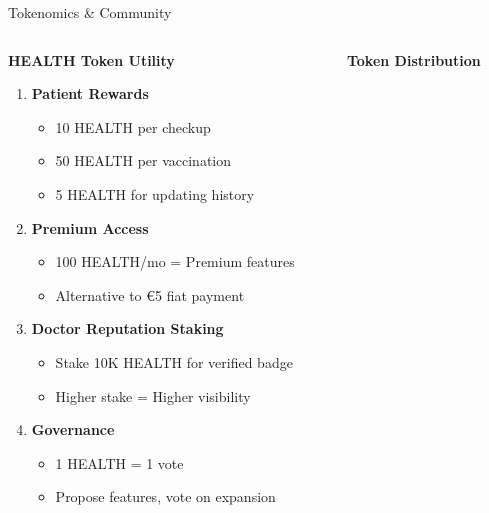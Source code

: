 \documentclass[aspectratio=169,xcolor=dvipsnames,20pt]{beamer}
\begin{document}
\begin{frame}{Tokenomics \& Community}

  \begin{columns}[T]
    \begin{column}{0.5\textwidth}
      \textbf{\textcolor{HederaPurple}{HEALTH Token Utility}}

      \begin{enumerate}
        \item \textbf{Patient Rewards}
        \begin{itemize}
          \item 10 HEALTH per checkup
          \item 50 HEALTH per vaccination
          \item 5 HEALTH for updating history
        \end{itemize}

        \item \textbf{Premium Access}
        \begin{itemize}
          \item 100 HEALTH/mo = Premium features
          \item Alternative to €5 fiat payment
        \end{itemize}

        \item \textbf{Doctor Reputation Staking}
        \begin{itemize}
          \item Stake 10K HEALTH for verified badge
          \item Higher stake = Higher visibility
        \end{itemize}

        \item \textbf{Governance}
        \begin{itemize}
          \item 1 HEALTH = 1 vote
          \item Propose features, vote on expansion
        \end{itemize}
      \end{enumerate}
    \end{column}

    \begin{column}{0.5\textwidth}
      \textbf{\textcolor{HederaPurple}{Token Distribution}}


\end{column}
\end{columns}
\end{frame}
\end{document}
